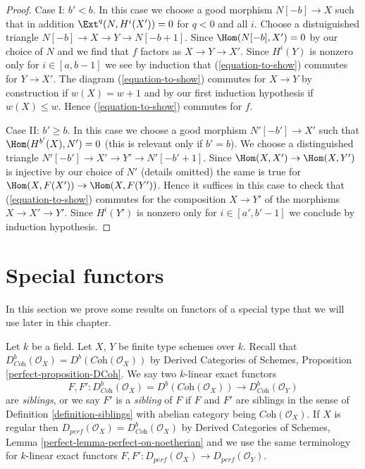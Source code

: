 \begin{proof}
\medskip\noindent
Case I: $b' < b$. In this case we choose a good morphism
$N[-b] \to X$ such that in addition $\Ext^q(N, H^i(X')) = 0$
for $q < 0$ and all $i$. Choose a distuiguished triangle
$N[-b] \to X \to Y \to N[-b + 1]$. Since
$\Hom(N[-b], X') = 0$ by our choice of $N$ and we find that $f$ factors
as $X \to Y \to X'$. Since $H^i(Y)$ is nonzero only for $i \in [a, b - 1]$
we see by induction that (\ref{equation-to-show}) commutes for
$Y \to X'$. The diagram (\ref{equation-to-show}) commutes for
$X \to Y$ by construction if $w(X) = w + 1$ and by our first
induction hypothesis if $w(X) \leq w$.
Hence (\ref{equation-to-show}) commutes for $f$.

\medskip\noindent
Case II: $b' \geq b$. In this case we choose a good morphism
$N'[-b'] \to X'$ such that $\Hom(H^{b'}(X), N') = 0$ (this is
relevant only if $b' = b$). We choose a distinguished triangle
$N'[-b'] \to X' \to Y' \to N'[-b' + 1]$. Since
$\Hom(X, X') \to \Hom(X, Y')$ is injective by our choice of $N'$
(details omitted) the same is true for
$\Hom(X, F(X')) \to \Hom(X, F(Y'))$.
Hence it suffices in this case to check that
(\ref{equation-to-show}) commutes for the composition $X \to Y'$
of the morphisms $X \to X' \to Y'$.
Since $H^i(Y')$ is nonzero only for $i \in [a', b' - 1]$
we conclude by induction hypothesis.
\end{proof}










\section{Special functors}
\label{section-special-functors}

\noindent
In this section we prove some results on functors of a special type
that we will use later in this chapter.

\begin{definition}
\label{definition-siblings-geometric}
Let $k$ be a field. Let $X$, $Y$ be finite type schemes over $k$.
Recall that
$D^b_{\textit{Coh}}(\mathcal{O}_X) = D^b(\textit{Coh}(\mathcal{O}_X))$
by Derived Categories of Schemes, Proposition \ref{perfect-proposition-DCoh}.
We say two $k$-linear exact functors
$$
F, F' :
D^b_{\textit{Coh}}(\mathcal{O}_X) = D^b(\textit{Coh}(\mathcal{O}_X))
\longrightarrow
D^b_{\textit{Coh}}(\mathcal{O}_Y)
$$
are {\it siblings}, or we say $F'$ is a {\it sibling} of $F$ if $F$ and $F'$
are siblings in the sense of Definition \ref{definition-siblings}
with abelian category being $\textit{Coh}(\mathcal{O}_X)$.
If $X$ is regular then
$D_{perf}(\mathcal{O}_X) = D^b_{\textit{Coh}}(\mathcal{O}_X)$ by
Derived Categories of Schemes, Lemma \ref{perfect-lemma-perfect-on-noetherian}
and we use the same terminology for $k$-linear exact functors
$F, F' : D_{perf}(\mathcal{O}_X) \to D_{perf}(\mathcal{O}_Y)$.
\end{definition}

